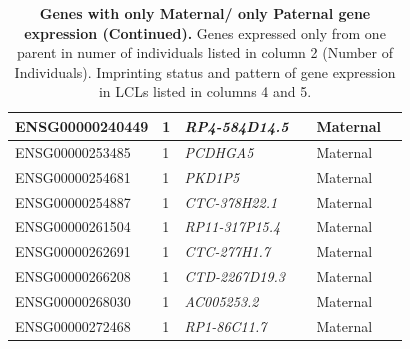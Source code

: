 \begin{table}
\begin{adjustbox}{width={\textwidth}}
\begin{tabular}{@{}p{4cm}p{3cm}p{3cm}p{3cm}p{3cm}p{3cm}@{}}
ENSG00000240449 & 1 & \emph{RP4-584D14.5} & & Maternal &   \\ \hline
ENSG00000253485 & 1 & \emph{PCDHGA5} & &   Maternal &   \\ \hline
ENSG00000254681 & 1 & \emph{PKD1P5} & & Maternal &   \\ \hline
ENSG00000254887 & 1 & \emph{CTC-378H22.1} & & Maternal &   \\ \hline
ENSG00000261504 & 1 & \emph{RP11-317P15.4} & & Maternal &   \\ \hline
ENSG00000262691 & 1 & \emph{CTC-277H1.7} & & Maternal &   \\ \hline
ENSG00000266208 & 1 & \emph{CTD-2267D19.3}& & Maternal &   \\ \hline
ENSG00000268030 & 1 & \emph{AC005253.2} & & Maternal &   \\ \hline
ENSG00000272468 & 1 & \emph{RP1-86C11.7} & & Maternal &   \\ \hline
\end{tabular}
\end{adjustbox}
\caption[]{\textbf{Genes with only Maternal/ only Paternal gene expression (Continued).  }Genes expressed only from one parent in numer of individuals listed in column 2 (Number of Individuals). Imprinting status and pattern of gene expression in LCLs listed in columns 4 and 5.}
\label{tab:oneparentexpression4}
\end{table}


